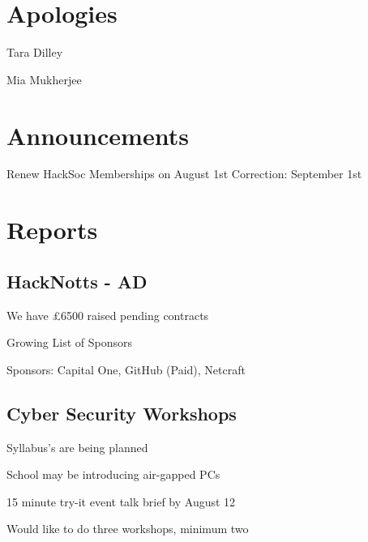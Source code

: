 \documentclass[11pt,hacksoc]{meetingmins}
\begin{document}
\maketitle

\section{Apologies}
\begin{items}
	\item Tara Dilley
	\item Mia Mukherjee
\end{items}

\section{Announcements}
\begin{items}
	\item Renew HackSoc Memberships on August 1st
		\subitem Correction: September 1st
\end{items}

\section{Reports}

\subsection{HackNotts - AD}
\begin{hiddensubitems}
	\item We have \pounds6500 raised
		 pending contracts
	\item Growing List of Sponsors
	\item Sponsors: Capital One, GitHub (Paid), Netcraft
\end{hiddensubitems}

\subsection{Cyber Security Workshops}
\begin{hiddensubitems}
	\item Syllabus's are being planned
	\item School may be introducing air-gapped PCs
	\item 15 minute try-it event talk brief by August 12
	\item Would like to do three workshops, minimum two
\end{hiddensubitems}
\end{document}
